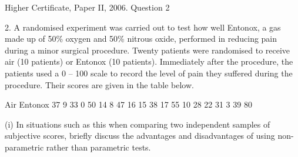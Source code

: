 \documentclass[a4paper,12pt]{article}
\begin{document}
Higher Certificate, Paper II, 2006.  Question 2 
\begin{framed}

2. A randomised experiment was carried out to test how well Entonox, a gas made up of 50\% oxygen and 50\% nitrous oxide, performed in reducing pain during a minor surgical procedure.  Twenty patients were randomised to receive air (10 patients) or Entonox (10 patients).  Immediately after the procedure, the patients used a 0 – 100 scale to record the level of pain they suffered during the procedure.  Their scores are given in the table below. 
 
Air Entonox 37   9 33   0 50 14   8 47 16 15 38 17 55 10 28 22 31   3 39 80 
 
(i) In situations such as this when comparing two independent samples of subjective scores, briefly discuss the advantages and disadvantages of using non-parametric rather than parametric tests. 

\end{framed}
\end{document}
